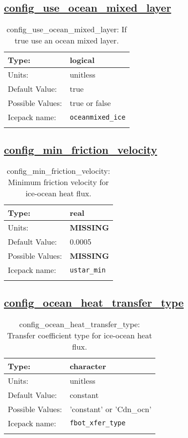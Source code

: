 \subsection[config\_use\_ocean\_mixed\_layer]{\hyperref[sec:nm_tab_ocean]{config\_use\_ocean\_mixed\_layer}}
\label{subsec:nm_sec_config_use_ocean_mixed_layer}
\begin{center}
\begin{longtable}{| p{2.0in} || p{4.0in} |}
    \hline
    Type: & logical \\
    \hline
    Units: & \si{unitless} \\
    \hline
    Default Value: & true \\
    \hline
    Possible Values: & true or false \\
    \hline
    Icepack name: & \verb+oceanmixed_ice+ \\
    \hline
    \caption{config\_use\_ocean\_mixed\_layer: If true use an ocean mixed layer.}
\end{longtable}
\end{center}
\subsection[config\_min\_friction\_velocity]{\hyperref[sec:nm_tab_ocean]{config\_min\_friction\_velocity}}
\label{subsec:nm_sec_config_min_friction_velocity}
\begin{center}
\begin{longtable}{| p{2.0in} || p{4.0in} |}
    \hline
    Type: & real \\
    \hline
    Units: & {\bf \color{red} MISSING} \\
    \hline
    Default Value: & 0.0005 \\
    \hline
    Possible Values: & {\bf \color{red} MISSING} \\
    \hline
    Icepack name: & \verb+ustar_min+ \\
    \hline
    \caption{config\_min\_friction\_velocity: Minimum friction velocity for ice-ocean heat flux.}
\end{longtable}
\end{center}
\subsection[config\_ocean\_heat\_transfer\_type]{\hyperref[sec:nm_tab_ocean]{config\_ocean\_heat\_transfer\_type}}
\label{subsec:nm_sec_config_ocean_heat_transfer_type}
\begin{center}
\begin{longtable}{| p{2.0in} || p{4.0in} |}
    \hline
    Type: & character \\
    \hline
    Units: & \si{unitless} \\
    \hline
    Default Value: & constant \\
    \hline
    Possible Values: & 'constant' or 'Cdn\_ocn' \\
    \hline
    Icepack name: & \verb+fbot_xfer_type+ \\
    \hline
    \caption{config\_ocean\_heat\_transfer\_type: Transfer coefficient type for ice-ocean heat flux.}
\end{longtable}
\end{center}
